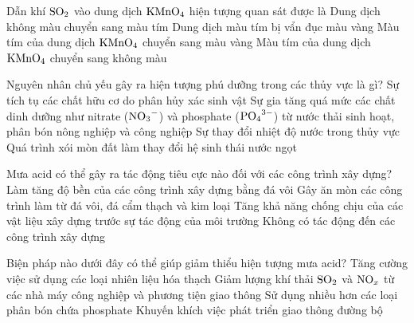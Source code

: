\documentclass[12pt,a4paper]{article}
\begin{document}
\begin{ex}
Dẫn khí $\ce{SO2}$ vào dung dịch $\ce{KMnO4}$ hiện tượng quan sát được là
\choice
{Dung dịch không màu chuyển sang màu tím}
{Dung dịch màu tím bị vẩn đục màu vàng}
{Màu tím của dung dịch $\ce{KMnO4}$ chuyển sang màu vàng}
{\True Màu tím của dung dịch $\ce{KMnO4}$ chuyển sang không màu}

\end{ex}

\begin{ex}
Nguyên nhân chủ yếu gây ra hiện tượng phú dưỡng trong các thủy vực là gì?
\choice
{Sự tích tụ các chất hữu cơ do phân hủy xác sinh vật}
{\True Sự gia tăng quá mức các chất dinh dưỡng như nitrate ($\ce{NO3-}$) và phosphate ($\ce{PO4^3-}$) từ nước thải sinh hoạt, phân bón nông nghiệp và công nghiệp}
{Sự thay đổi nhiệt độ nước trong thủy vực}
{Quá trình xói mòn đất làm thay đổi hệ sinh thái nước ngọt}

\end{ex}

\begin{ex}
Mưa acid có thể gây ra tác động tiêu cực nào đối với các công trình xây dựng?
\choice
{Làm tăng độ bền của các công trình xây dựng bằng đá vôi}
{\True Gây ăn mòn các công trình làm từ đá vôi, đá cẩm thạch và kim loại}
{Tăng khả năng chống chịu của các vật liệu xây dựng trước sự tác động của môi trường}
{Không có tác động đến các công trình xây dựng}

\end{ex}

\begin{ex}
Biện pháp nào dưới đây có thể giúp giảm thiểu hiện tượng mưa acid?
\choice
{Tăng cường việc sử dụng các loại nhiên liệu hóa thạch}
{\True Giảm lượng khí thải $\ce{SO2}$ và $\ce{NO_x}$ từ các nhà máy công nghiệp và phương tiện giao thông}
{Sử dụng nhiều hơn các loại phân bón chứa phosphate}
{Khuyến khích việc phát triển giao thông đường bộ}

\end{ex}
\end{document}
